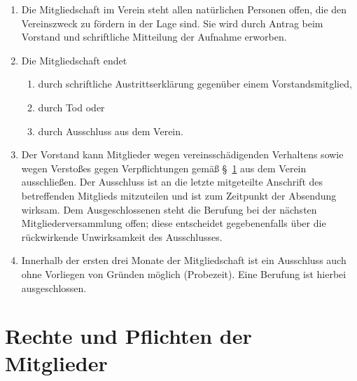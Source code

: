 \documentclass[a4paper, 10pt, headings=normal]{scrartcl}
\begin{document}
\begin{multicols}{2}
\begin{enumerate}[label={(\arabic*)}]
	\item
		Die Mitgliedschaft im Verein steht allen natürlichen Personen offen, die den Vereinszweck zu fördern in der Lage sind.
		Sie wird durch Antrag beim Vorstand und schriftliche Mitteilung der Aufnahme erworben.
	\item
		Die Mitgliedschaft endet
		\begin{enumerate}[label={\arabic*.}]
			\item
				durch schriftliche Austrittserklärung gegenüber einem Vorstandsmitglied,
			\item
				durch Tod oder
			\item
				durch Ausschluss aus dem Verein.
		\end{enumerate}
	\item
		Der Vorstand kann Mitglieder wegen vereinsschädigenden Verhaltens sowie wegen Verstoßes gegen Verpflichtungen gemäß §~\ref{par:rechte-pflichten-mitglieder} aus dem Verein ausschließen.
		Der Ausschluss ist an die letzte mitgeteilte Anschrift des betreffenden Mitglieds mitzuteilen und ist zum Zeitpunkt der Absendung wirksam.
		Dem Ausgeschlossenen steht die Berufung bei der nächsten Mitgliederversammlung offen; diese entscheidet gegebenenfalls über die rückwirkende Unwirksamkeit des Ausschlusses.
	\item
		Innerhalb der ersten drei Monate der Mitgliedschaft ist ein Ausschluss auch ohne Vorliegen von Gründen möglich (Probezeit). Eine Berufung ist hierbei ausgeschlossen.
\end{enumerate}

\section{Rechte und Pflichten der Mitglieder}
\label{par:rechte-pflichten-mitglieder}


\end{multicols}
\end{document}
